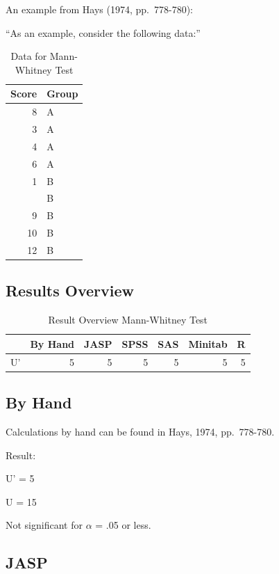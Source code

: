 \documentclass[
]{book}
\begin{document}
An example from Hays (1974, pp.~778-780):

``As an example, consider the following data:''

\begin{table}

\caption{\label{tab:unnamed-chunk-15}Data for Mann-Whitney Test}
\centering
\begin{tabular}[t]{rl}
\toprule
Score & Group\\
\midrule
8 & A\\
3 & A\\
4 & A\\
6 & A\\
1 & B\\
\addlinespace
7 & B\\
9 & B\\
10 & B\\
12 & B\\
\bottomrule
\end{tabular}
\end{table}

\hypertarget{results-overview-1}{%
\subsection{Results Overview}\label{results-overview-1}}

\begin{table}

\caption{\label{tab:unnamed-chunk-16}Result Overview Mann-Whitney Test}
\centering
\begin{tabular}[t]{lrrrrrr}
\toprule
  & By Hand & JASP & SPSS & SAS & Minitab & R\\
\midrule
U' & 5 & 5 & 5 & 5 & 5 & 5\\
\bottomrule
\end{tabular}
\end{table}

\hypertarget{by-hand-1}{%
\subsection{By Hand}\label{by-hand-1}}

Calculations by hand can be found in Hays, 1974, pp.~778-780.

Result:

U' = 5

U = 15

Not significant for \(\alpha\) = .05 or less.

\hypertarget{jasp-1}{%
\subsection{JASP}\label{jasp-1}}
\end{document}
